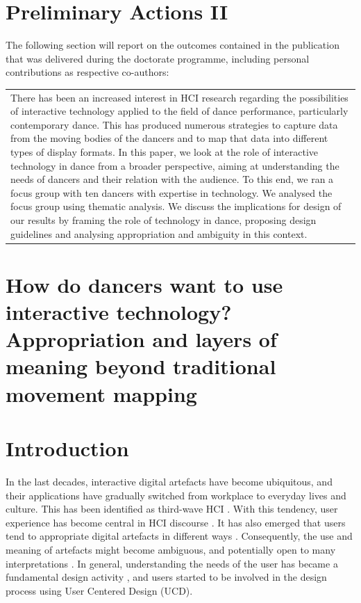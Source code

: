 \section{Preliminary Actions II}

The following section will report on the outcomes contained in the publication that was delivered during the doctorate programme, including personal contributions as respective co-authors: 


\begin{center}
\begin{tabular}{ p{13cm}}
There has been an increased interest in HCI research regarding the possibilities of interactive technology applied to the field of dance performance, particularly contemporary dance. This has produced numerous strategies to capture data from the moving bodies of the dancers and to map that data into different types of display formats. In this paper, we look at the role of interactive technology in dance from a broader perspective, aiming at understanding the needs of dancers and their relation with the audience. To this end, we ran a focus group with ten dancers with expertise in technology. We analysed the focus group using thematic analysis. We discuss the implications for design of our results by framing the role of technology in dance, proposing design guidelines and analysing appropriation and ambiguity in this context.
\end{tabular}
\end{center}

\section{How do dancers want to use interactive technology? Appropriation and layers of meaning beyond traditional movement mapping}

\section{Introduction}
 
In the last decades, interactive digital artefacts have become ubiquitous, and their applications have gradually switched from workplace to everyday lives and culture. This has been identified as third-wave HCI \cite{bodker2015third}. With this tendency, user experience has become central in HCI discourse \cite{wright2005user}. It has also emerged that users tend to appropriate digital artefacts in different ways \cite{dourish2003appropriation}. Consequently, the use and meaning of artefacts might become ambiguous, and potentially open to many interpretations \cite{gaver2003ambiguity}.
In general, understanding the needs of the user has became a fundamental design activity \cite{bannon2011reimagining}, and users started to be involved in the design process using User Centered Design (UCD).

